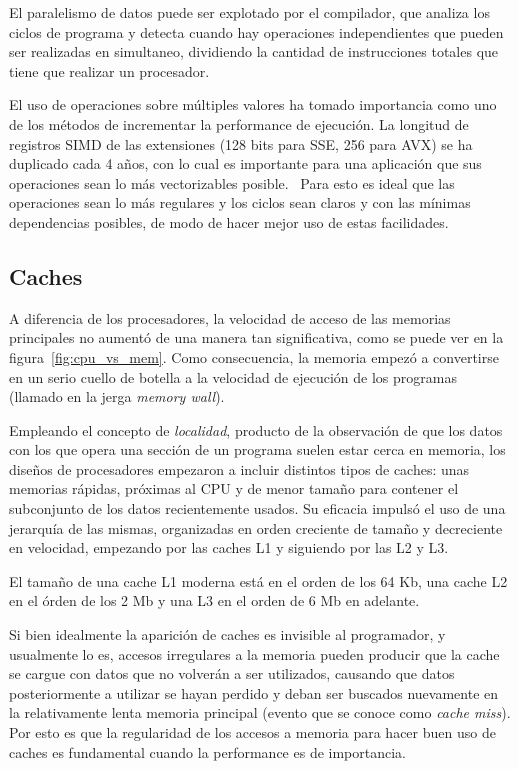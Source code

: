 El paralelismo de datos puede ser explotado por el compilador, que analiza los ciclos de programa y detecta cuando hay operaciones
independientes que pueden ser realizadas en simultaneo, dividiendo la cantidad de instrucciones totales que tiene que realizar
un procesador.

El uso de operaciones sobre m\'ultiples valores ha tomado importancia como uno de los m\'etodos de incrementar
la performance de ejecuci\'on. La longitud de registros SIMD de las extensiones (128 bits para SSE, 256 para AVX)
se ha duplicado cada 4 a\~nos, con lo cual es importante para una aplicaci\'on que sus operaciones sean lo m\'as
vectorizables posible.~\cite{HennessyPatterson} Para esto es ideal que las operaciones sean lo m\'as regulares y
los ciclos sean claros y con las m\'inimas dependencias posibles, de modo de hacer mejor uso de estas facilidades.

\subsection{Caches}

A diferencia de los procesadores, la velocidad de acceso de las memorias principales no aument\'o de una manera
tan significativa, como se puede ver en la figura~\ref{fig:cpu_vs_mem}. Como consecuencia, la memoria
empez\'o a convertirse en un serio cuello de botella a la velocidad de ejecuci\'on de los programas (llamado
en la jerga \textit{memory wall}).

Empleando el concepto de \textit{localidad}, producto de la observaci\'on de que los datos con los que opera una
secci\'on de un programa suelen estar cerca en memoria, los dise\~nos de procesadores empezaron a incluir distintos
tipos de caches: unas memorias r\'apidas, pr\'oximas al CPU y de menor tama\~no para contener el subconjunto de los datos
recientemente usados. Su eficacia impuls\'o el uso de una jerarqu\'ia de las mismas, organizadas en orden creciente
de tama\~no y decreciente en velocidad, empezando por las caches L1 y siguiendo por las L2 y L3.

El tama\~no de una cache L1 moderna est\'a en el orden de los 64 Kb, una cache L2 en el \'orden de los 2 Mb y
una L3 en el orden de 6 Mb en adelante.

Si bien idealmente la aparici\'on de caches es invisible al programador, y usualmente lo es, accesos irregulares a la
memoria pueden producir que la cache se cargue con datos que no volver\'an a ser utilizados, causando que datos posteriormente
a utilizar se hayan perdido y deban ser buscados nuevamente en la relativamente lenta memoria principal (evento que se conoce como
\textit{cache miss}). Por esto es que la regularidad de los accesos a memoria para hacer buen uso de caches es
fundamental cuando la performance es de importancia.

